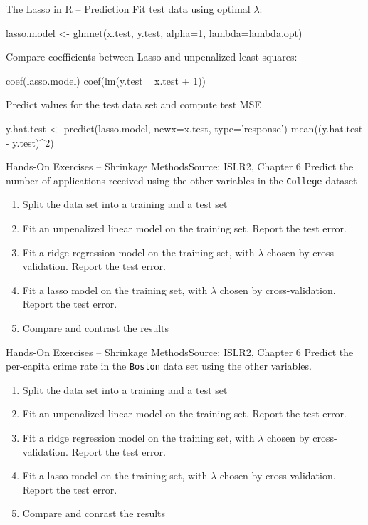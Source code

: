 \documentclass[ignorenonframetext,xcolor=x11names]{beamer}
\begin{document}
\begin{frame}[fragile]{The Lasso in R -- Prediction}
Fit test data using optimal $\lambda$:
\begin{Rcode}
lasso.model <- glmnet(x.test, y.test, 
                         alpha=1, lambda=lambda.opt)
\end{Rcode}
Compare coefficients between Lasso and unpenalized least squares:
\begin{Rcode}
coef(lasso.model)
coef(lm(y.test ~ x.test + 1))
\end{Rcode}
Predict values for the test data set and compute test MSE
\begin{Rcode}
y.hat.test <- predict(lasso.model, newx=x.test, 
                                      type='response')
mean((y.hat.test - y.test)^2)
\end{Rcode}
\end{frame}

\begin{frame}{Hands-On Exercises -- Shrinkage Methods}{Source: ISLR2, Chapter 6}
Predict the number of applications received using the other variables in the \texttt{College} dataset
  \begin{enumerate} 
      \item Split the data set into a training and a test set
      \item Fit an unpenalized linear model on the training set. Report the test error.
      \item Fit a ridge regression model on the training set, with $\lambda$ chosen by cross-validation. Report the test error.
      \item Fit a lasso model on the training set, with $\lambda$ chosen by cross-validation. Report the test error.
      \item Compare and contrast the results
  \end{enumerate}
\end{frame}

\begin{frame}{Hands-On Exercises -- Shrinkage Methods}{Source: ISLR2, Chapter 6}
Predict the per-capita crime rate in the \texttt{Boston} data set using the other variables.
  \begin{enumerate}
      \item Split the data set into a training and a test set
      \item Fit an unpenalized linear model on the training set. Report the test error.
      \item Fit a ridge regression model on the training set, with $\lambda$ chosen by cross-validation. Report the test error.
      \item Fit a lasso model on the training set, with $\lambda$ chosen by cross-validation. Report the test error.
      \item Compare and conrast the results
  \end{enumerate}
\end{frame}
\end{document}

